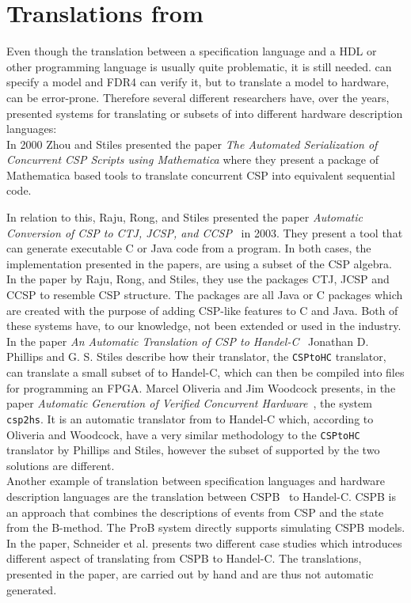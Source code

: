 \section{Translations from \cspm{}}
Even though the translation between a specification language and a HDL or other programming language is usually quite problematic, it is still needed.
\cspm{} can specify a model and FDR4 can verify it, but to translate a model to hardware, can be error-prone. Therefore several different researchers have,  over the years, presented systems for translating \cspm{} or subsets of \cspm{} into different hardware description languages:\\

In 2000 Zhou and Stiles presented the paper \textit{The Automated Serialization of Concurrent CSP Scripts using Mathematica}\cite{Zhou2000} where they present a package of Mathematica based tools to translate concurrent CSP into equivalent sequential code.

In relation to this, Raju,
Rong, and Stiles presented the paper \textit{Automatic Conversion of CSP to CTJ, JCSP, and CCSP}~\cite{Raju2003} in 2003. They present a tool that can generate executable C or Java code from a \cspm{} program. In both cases, the implementation presented in the papers, are using a subset of the CSP algebra. In the paper by Raju,
Rong, and Stiles, they use the packages CTJ, JCSP and CCSP to resemble CSP structure. The packages are all Java or C packages which are created with the purpose of adding CSP-like features to C and Java. Both of these systems have, to our knowledge, not been extended or used in the industry.\\

In the paper \textit{An Automatic Translation of CSP to Handel-C}~\cite{Phillips2004} Jonathan D. Phillips and G. S. Stiles describe how their translator, the \texttt{CSPtoHC} translator, can translate a small subset of \cspm{} to Handel-C\cite{Celoxia2002}, which can then be compiled into files for programming an FPGA.
Marcel Oliveria and Jim Woodcock presents, in the paper \textit{Automatic Generation of Verified Concurrent Hardware}~\cite{Oliveira2007}, the system \texttt{csp2hs}. It is an automatic translator from \cspm{} to Handel-C which, according to Oliveria and Woodcock, have a very similar methodology to the \texttt{CSPtoHC} translator by Phillips and Stiles, however the subset of \cspm{} supported by the two solutions are different.\\

Another example of translation between specification languages and hardware description languages are the translation between CSP\textbar\textbar B~\cite{Schneider2002a} to Handel-C. CSP\textbar\textbar B is an approach that combines the descriptions of events from CSP and the state from the B-method. The ProB system\cite{ProB}\cite{Leuschel2003} directly supports simulating CSP\textbar\textbar B models. In the paper,  Schneider et al. presents two different case studies which introduces different aspect of translating from CSP\textbar\textbar B to Handel-C. The translations, presented in the paper, are carried out by hand and are thus not automatic generated.\\

